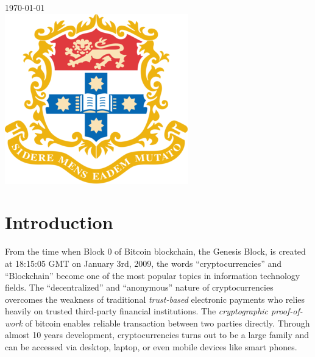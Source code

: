 \documentclass[12pt]{article}
\begin{document}
\begin{titlepage}
{\large \today}\\[2cm] %


\includegraphics{logo.png}\\[1cm] %
 

\vfill %

\end{titlepage}

\tableofcontents
\vfill

\newpage


\section{Introduction}

From the time when Block 0 of Bitcoin blockchain, the Genesis Block, is created at 18:15:05 GMT on January 3rd, 2009, the words ``cryptocurrencies'' and ``Blockchain'' become one of the most popular topics in information technology fields. The ``decentralized'' and ``anonymous'' nature of cryptocurrencies overcomes the weakness of traditional \textit{trust-based} electronic payments who relies heavily on trusted third-party financial institutions. The \textit{cryptographic proof-of-work} of bitcoin enables reliable transaction between two parties directly\cite{nakamoto2008bitcoin}. Through almost 10 years development, cryptocurrencies turns out to be a large family and can be accessed via desktop, laptop, or even mobile devices like smart phones.
\end{document}
